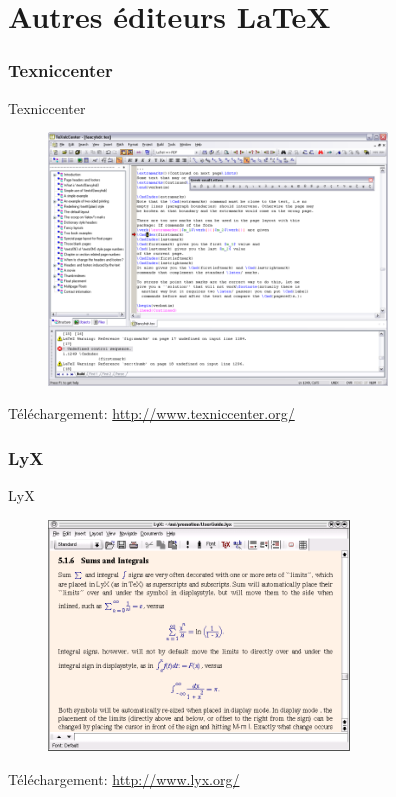 \documentclass{beamer}
\begin{document}

\part{Autres éditeurs \LaTeX}


\section{Texniccenter}

\begin{frame}{Texniccenter}

\begin{figure}
\centering
\includegraphics[width=9cm]{img/Texniccenter}
\end{figure}

{\footnotesize Téléchargement: \url{http://www.texniccenter.org/}}

\end{frame}


\section{LyX}

\begin{frame}{LyX}

\begin{figure}
\centering
\includegraphics[width=8cm]{img/LyXScreen_Linux_en}
\end{figure}

{\footnotesize Téléchargement: \url{http://www.lyx.org/}}

\end{frame}
\end{document}
